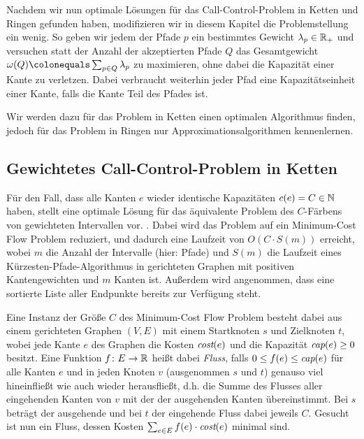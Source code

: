 Nachdem wir nun optimale Lösungen für das Call-Control-Problem in Ketten und Ringen gefunden haben, modifizieren
wir in diesem Kapitel die Problemstellung ein wenig.
So geben wir jedem der Pfade $p$ ein bestimmtes Gewicht $\lambda_p \in \mathbb R_+$ und versuchen statt der
Anzahl der akzeptierten Pfade $Q$ das Gesamtgewicht $\omega(Q) \colonequals \sum_{p\in Q}\lambda_p$ zu maximieren, ohne
dabei die Kapazität einer Kante zu verletzen.
Dabei verbraucht weiterhin jeder Pfad eine Kapazitätseinheit einer Kante, falls die Kante Teil des Pfades ist.

Wir werden dazu für das Problem in Ketten einen optimalen Algorithmus finden, jedoch für das Problem in Ringen
nur Approximationsalgorithmen kennenlernen. 

\subsection{Gewichtetes Call-Control-Problem in Ketten}\label{subsec:weighted-call-control-in-chains}
Für den Fall, dass alle Kanten $e$ wieder identische Kapazitäten $c(e) = C \in \mathbb N$ haben, stellt 
eine optimale Lösung für das äquivalente Problem des $C$-Färbens von gewichteten Intervallen vor. .
Dabei wird das Problem auf ein Minimum-Cost Flow Problem reduziert, und dadurch eine Laufzeit von $O(C\cdot S(m))$
erreicht, wobei $m$ die Anzahl der Intervalle (hier: Pfade) und $S(m)$ die Laufzeit eines Kürzesten-Pfade-Algorithmus
in gerichteten Graphen mit positiven Kantengewichten und $m$ Kanten ist.
Außerdem wird angenommen, dass eine sortierte Liste aller Endpunkte bereits zur Verfügung steht. 

Eine Instanz der Größe $C$ des Minimum-Cost Flow Problem besteht dabei aus einem gerichteten Graphen $(V,E)$ mit
einem Startknoten $s$ und Zielknoten $t$, wobei jede Kante $e$ des Graphen die Kosten $\text{\em cost}(e)$ und die Kapazität
$\text{\em cap}(e) \geq 0$ besitzt.
Eine Funktion $f\colon E \rightarrow \mathbb R$ heißt dabei {\em Fluss}, falls  $0 \leq f(e) \leq \text{\em cap}(e)$ für alle
Kanten $e$ und in jeden Knoten $v$ (ausgenommen $s$ und $t$) genauso viel hineinfließt wie auch wieder herausfließt, d.h.
die Summe des Flusses aller eingehenden Kanten von $v$ mit der der ausgehenden Kanten übereinstimmt.
Bei $s$ beträgt der ausgehende und bei $t$ der eingehende Fluss dabei jeweils $C$.
Gesucht ist nun ein Fluss, dessen Kosten $\sum_{e\in E}f(e) \cdot \text{\em cost}(e)$ minimal sind.

